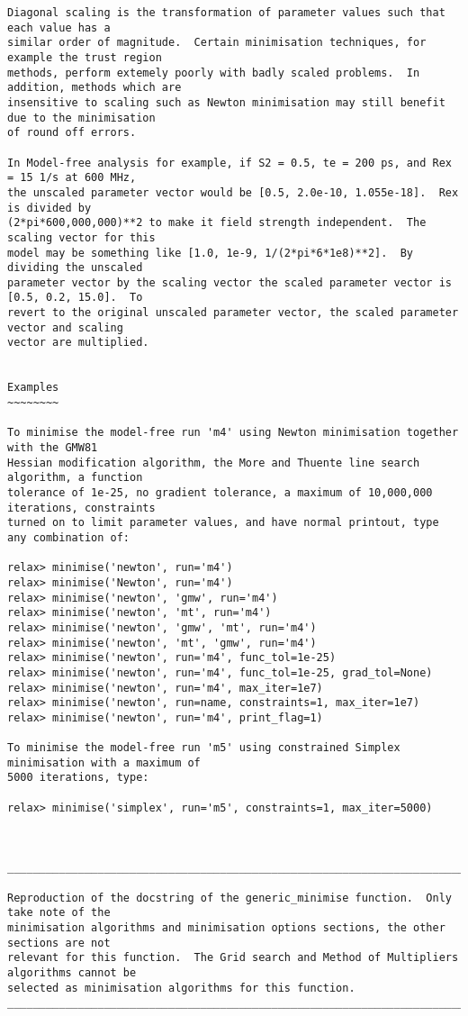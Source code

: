 \begin{verbatim}
Diagonal scaling is the transformation of parameter values such that each value has a
similar order of magnitude.  Certain minimisation techniques, for example the trust region
methods, perform extemely poorly with badly scaled problems.  In addition, methods which are
insensitive to scaling such as Newton minimisation may still benefit due to the minimisation
of round off errors.

In Model-free analysis for example, if S2 = 0.5, te = 200 ps, and Rex = 15 1/s at 600 MHz,
the unscaled parameter vector would be [0.5, 2.0e-10, 1.055e-18].  Rex is divided by
(2*pi*600,000,000)**2 to make it field strength independent.  The scaling vector for this
model may be something like [1.0, 1e-9, 1/(2*pi*6*1e8)**2].  By dividing the unscaled
parameter vector by the scaling vector the scaled parameter vector is [0.5, 0.2, 15.0].  To
revert to the original unscaled parameter vector, the scaled parameter vector and scaling
vector are multiplied.


Examples
~~~~~~~~

To minimise the model-free run 'm4' using Newton minimisation together with the GMW81
Hessian modification algorithm, the More and Thuente line search algorithm, a function
tolerance of 1e-25, no gradient tolerance, a maximum of 10,000,000 iterations, constraints
turned on to limit parameter values, and have normal printout, type any combination of:

relax> minimise('newton', run='m4')
relax> minimise('Newton', run='m4')
relax> minimise('newton', 'gmw', run='m4')
relax> minimise('newton', 'mt', run='m4')
relax> minimise('newton', 'gmw', 'mt', run='m4')
relax> minimise('newton', 'mt', 'gmw', run='m4')
relax> minimise('newton', run='m4', func_tol=1e-25)
relax> minimise('newton', run='m4', func_tol=1e-25, grad_tol=None)
relax> minimise('newton', run='m4', max_iter=1e7)
relax> minimise('newton', run=name, constraints=1, max_iter=1e7)
relax> minimise('newton', run='m4', print_flag=1)

To minimise the model-free run 'm5' using constrained Simplex minimisation with a maximum of
5000 iterations, type:

relax> minimise('simplex', run='m5', constraints=1, max_iter=5000)



____________________________________________________________________________________________

Reproduction of the docstring of the generic_minimise function.  Only take note of the
minimisation algorithms and minimisation options sections, the other sections are not
relevant for this function.  The Grid search and Method of Multipliers algorithms cannot be
selected as minimisation algorithms for this function.
____________________________________________________________________________________________



\end{verbatim}
